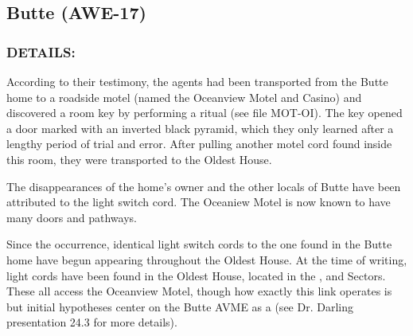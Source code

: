 \subsection*{Butte (AWE-17)}
\subsubsection*{DETAILS:}
\par According to their testimony, the agents had been transported
from the Butte home to a roadside motel (named the Oceanview
Motel and Casino) and discovered a room key by performing a
ritual (see file MOT-OI). The key opened a door marked with an
inverted black pyramid, which they only learned after a lengthy
period of trial and error. After pulling another motel cord found
inside this room, they were transported to the Oldest House.
\par The disappearances of the home's owner and the other locals of
Butte have been attributed to the light switch cord. The Oceaniew
Motel is now known to have many doors and pathways.
\par Since the occurrence, identical light switch cords to the one
found in the Butte home have begun appearing throughout the
Oldest House. At the time of writing, 
light cords have been found in the Oldest House, located in the , and  Sectors. These all access the Oceanview Motel, though how exactly this link
operates is  but initial hypotheses center on the Butte AVME as a   (see Dr. Darling presentation 24.3 for more details).